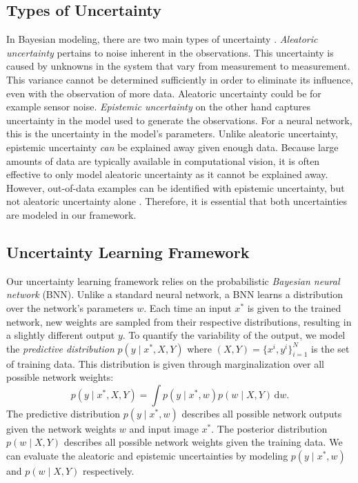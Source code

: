 \documentclass{article}
\begin{document}
\subsection{Types of Uncertainty}

In Bayesian modeling, there are two main types of uncertainty \cite{KIUREGHIAN2009105}. \textit{Aleatoric uncertainty} pertains to noise inherent in the observations. This uncertainty is caused by unknowns in the system that vary from measurement to measurement. This variance cannot be determined sufficiently in order to eliminate its influence, even with the observation of more data. Aleatoric uncertainty could be for example sensor noise. \textit{Epistemic uncertainty} on the other hand captures uncertainty in the model used to generate the observations. For a neural network, this is the uncertainty in the model's parameters. Unlike aleatoric uncertainty, epistemic uncertainty \textit{can} be explained away given enough data. Because large amounts of data are typically available in computational vision, it is often  effective to only model aleatoric uncertainty as it cannot be explained away. However, out-of-data examples can be identified with epistemic uncertainty, but not aleatoric uncertainty alone \cite{Kendall2017}. Therefore, it is essential that both uncertainties are modeled in our framework.


\subsection{Uncertainty Learning Framework}
\label{sec:uncert}
Our uncertainty learning framework relies on the probabilistic \textit{Bayesian neural network} (BNN). Unlike a standard neural network, a BNN learns a distribution over the network's parameters $w$.
Each time an input $x^\ast$ is 
given to the trained network, new weights are sampled from their respective 
distributions, resulting in a slightly different output $y$.
To quantify the variability of the output, we model  the \textit{predictive distribution} $p(y \mid x^\ast, X, Y)$ where $(X,Y) = \{x^i, y^i\}_{i=1}^N$ is the set of training data. This distribution is given through marginalization over all possible network weights:
\begin{equation}
    p(y \mid x^\ast, X, Y) = \int p(y \mid x^\ast, w)p(w \mid X, Y)\, \mathrm{d}w.
\end{equation}
The predictive distribution $p(y \mid x^\ast, w)$ describes all possible network outputs given the network weights $w$  and input image $x^\ast$. The posterior distribution $p(w \mid X, Y)$ describes all possible network weights given the training data.  We can evaluate the aleatoric and epistemic uncertainties by modeling $p(y \mid x^\ast, w)$ and $p(w \mid X, Y)$ respectively.
\end{document}
